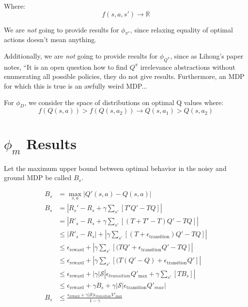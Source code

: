 \documentclass[11pt]{amsart}
\begin{document}
Where:
\begin{equation}
f(s,a,s') \rightarrow \mathbb{R}
\end{equation}


 We are {\it not} going to provide results for $\phi_{\pi^*}$, since relaxing equality of optimal actions doesn't mean anything.

 Additionally, we are {\it not} going to provide results for $\phi_{Q^\pi}$, since as Lihong's paper notes, ``It is an open question how to find $Q^\pi$ irrelevance abstractions without enumerating all possible policies, they do not give results. Furthermore, an MDP for which this is true is an awfully weird MDP...

 For $\phi_D$, we consider the space of distributions on optimal Q values where:
\begin{equation}
f(Q(s,a)) > f(Q(s,a_2)) \rightarrow Q(s,a_1) > Q(s,a_2)
\end{equation}

\newpage
\section{$\phi_{m}$ Results}

Let the maximum upper bound between optimal behavior in the noisy and ground MDP be called $B_s$.

\begin{align*}
B_{s} &= \max_{s,a}|Q'(s,a)-Q(s,a)|\\
B_{s} &= |R_s' - R_s + \gamma \sum_{s'}\left[T'Q'-TQ\right]|\\
&=|R'_s-R_s + \gamma \sum_{s'}\left[(T+T'-T)Q'-TQ\right]|\\
&\leq |R'_s-R_s|+|\gamma \sum_{s'}\left[(T+\epsilon_{\text{transition}})Q' - TQ\right]|\\
&\leq \epsilon_{\text{reward}}+|\gamma \sum_{s'}\left[(TQ'+\epsilon_{\text{transition}}Q' - TQ\right]|\\
&\leq \epsilon_{\text{reward}}+|\gamma \sum_{s'}\left[(T(Q'-Q)+\epsilon_{\text{transition}}Q' \right]|\\
&\leq \epsilon_{\text{reward}}+|\gamma |\mathcal{S}|\epsilon_{transition}Q'_{\text{max}} + \gamma \sum_{s'}\left[ T B_s\right]|\\
&\leq \epsilon_{\text{reward}} + \gamma B_{s} + \gamma |\mathcal{S}|\epsilon_{\text{transition}}Q'_{max}|\\
B_{s} &\leq 
\frac
{{\epsilon_{\text{reward}}} + \gamma |\mathcal{S}|\epsilon_{transition}V'_{\text{max}}}
{1-\gamma}
\end{align*}
\end{document}
